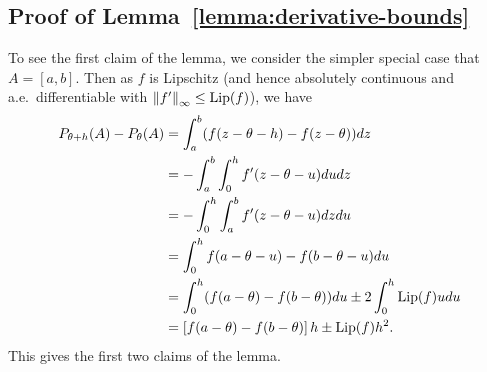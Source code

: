 




\subsection{Proof of Lemma~\ref{lemma:derivative-bounds}}
\label{sec:proof-derivative-bounds}

To see the first claim of the lemma, we consider the simpler special case
that $A = [a, b]$. Then as $f$ is Lipschitz (and hence absolutely
continuous and a.e.\ differentiable with $\left\|{f'}\right\|_\infty \le {\rm \textup{Lip}}(f)$),
we have
\begin{align*}
  P_{\theta + h}(A)
  - P_\theta(A)
  & = \int_a^b (f(z - \theta - h) - f(z - \theta)) dz \\
  & = -\int_a^b \int_0^h f'(z - \theta - u) du dz \\
  & = -\int_0^h \int_a^b f'(z - \theta - u) dz du \\
  & = \int_0^h f(a - \theta - u) - f(b - \theta - u) du \\
  & = \int_0^h (f(a - \theta) - f(b - \theta)) du
  \pm 2 \int_0^h {\rm \textup{Lip}}(f) u du \\
  & = \left[f(a - \theta) - f(b - \theta)\right] h \pm {\rm \textup{Lip}}(f) h^2.
\end{align*}
This gives the first two claims of the lemma.

